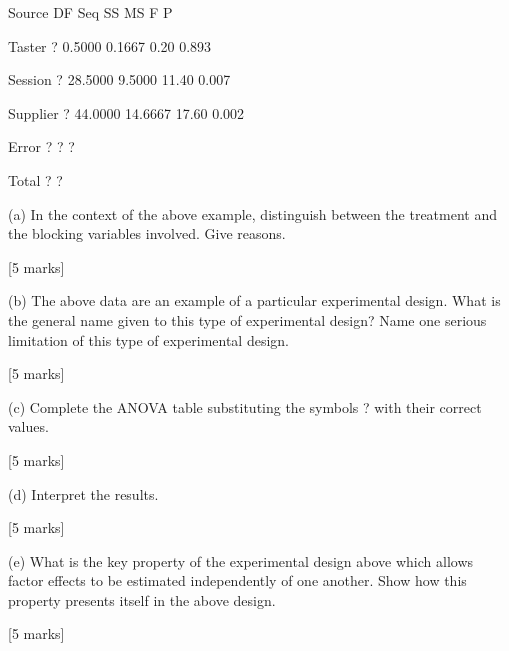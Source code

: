 Source DF Seq SS MS F P

Taster ? 0.5000 0.1667 0.20 0.893

Session ? 28.5000 9.5000 11.40 0.007

Supplier ? 44.0000 14.6667 17.60 0.002

Error ? ? ?

Total ? ?
\begin{itemize}

(a) In the context of the above example, distinguish between the treatment and the blocking variables involved. Give reasons.

[5 marks]

(b) The above data are an example of a particular experimental design. What is the general name given to this type of experimental design? Name one serious limitation of this type of experimental design.

[5 marks]

(c) Complete the ANOVA table substituting the symbols ? with their correct values.

[5 marks]

(d) Interpret the results.

[5 marks]

(e) What is the key property of the experimental design above which allows factor effects to be estimated independently of one another. Show how this property presents itself in the above design.

[5 marks]

\end{itemize}
